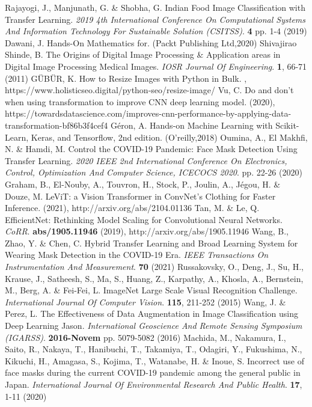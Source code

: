 \documentclass{article}
\begin{document}
\begin{thebibliography}{1}
	Rajayogi, J., Manjunath, G. \& Shobha, G. Indian Food Image Classification with Transfer Learning. {\em 2019 4th International Conference On Computational Systems And Information Technology For Sustainable Solution (CSITSS)}. \textbf{4} pp. 1-4 (2019)
	Dawani, J. Hands-On Mathematics for. (Packt Publishing Ltd,2020)
	Shivajirao Shinde, B. The Origins of Digital Image Processing & Application areas in Digital Image Processing Medical Images. {\em IOSR Journal Of Engineering}. \textbf{1}, 66-71 (2011)
	GÜBÜR, K. How to Resize Images with Python in Bulk. , https://www.holisticseo.digital/python-seo/resize-image/
	Vu, C. Do and don't when using transformation to improve CNN deep learning model.  (2020), https://towardsdatascience.com/improves-cnn-performance-by-applying-data-transformation-bf86b3f4cef4
	Géron, A. Hands-on Machine Learning with Scikit-Learn, Keras, and Tensorflow, 2nd edition. (O'reilly,2018)
	Oumina, A., El Makhfi, N. \& Hamdi, M. Control the COVID-19 Pandemic: Face Mask Detection Using Transfer Learning. {\em 2020 IEEE 2nd International Conference On Electronics, Control, Optimization And Computer Science, ICECOCS 2020}. pp. 22-26 (2020)
	Graham, B., El-Nouby, A., Touvron, H., Stock, P., Joulin, A., Jégou, H. \& Douze, M. LeViT: a Vision Transformer in ConvNet's Clothing for Faster Inference.  (2021), http://arxiv.org/abs/2104.01136
	Tan, M. \& Le, Q. EfficientNet: Rethinking Model Scaling for Convolutional Neural Networks. {\em CoRR}. \textbf{abs/1905.11946} (2019), http://arxiv.org/abs/1905.11946
	Wang, B., Zhao, Y. \& Chen, C. Hybrid Transfer Learning and Broad Learning System for Wearing Mask Detection in the COVID-19 Era. {\em IEEE Transactions On Instrumentation And Measurement}. \textbf{70} (2021)
	Russakovsky, O., Deng, J., Su, H., Krause, J., Satheesh, S., Ma, S., Huang, Z., Karpathy, A., Khosla, A., Bernstein, M., Berg, A. \& Fei-Fei, L. ImageNet Large Scale Visual Recognition Challenge. {\em International Journal Of Computer Vision}. \textbf{115}, 211-252 (2015)
	Wang, J. \& Perez, L. The Effectiveness of Data Augmentation in Image Classification using Deep Learning Jason. {\em International Geoscience And Remote Sensing Symposium (IGARSS)}. \textbf{2016-Novem} pp. 5079-5082 (2016)
	Machida, M., Nakamura, I., Saito, R., Nakaya, T., Hanibuchi, T., Takamiya, T., Odagiri, Y., Fukushima, N., Kikuchi, H., Amagasa, S., Kojima, T., Watanabe, H. \& Inoue, S. Incorrect use of face masks during the current COVID-19 pandemic among the general public in Japan. {\em International Journal Of Environmental Research And Public Health}. \textbf{17}, 1-11 (2020)

\end{thebibliography}
\end{document}
